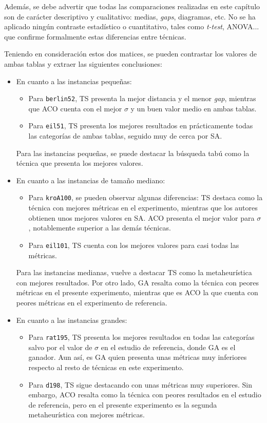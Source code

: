 Además, se debe advertir que todas las comparaciones realizadas en este capítulo son de carácter descriptivo y cualitativo:
medias, \textit{gaps}, diagramas, etc. No se ha aplicado ningún contraste estadístico o cuantitativo, tales como \textit{t-test},
ANOVA... que confirme formalmente estas diferencias entre técnicas.

Teniendo en consideración estos dos matices, se pueden contrastar los valores de ambas tablas y extraer las siguientes 
conclusiones:

\begin{itemize}
  \item En cuanto a las instancias pequeñas:
  \begin{itemize}
    \item Para \texttt{berlin52}, TS presenta la mejor distancia y el menor \textit{gap}, mientras que ACO cuenta con el mejor
    $\sigma$ y un buen valor medio en ambas tablas.
    \item Para \texttt{eil51}, TS presenta los mejores resultados en prácticamente todas las categorías de ambas tablas, 
    seguido muy de cerca por SA.
  \end{itemize}
  Para las instancias pequeñas, se puede destacar la búsqueda tabú como la técnica que presenta los mejores valores.

  \item En cuanto a las instancias de tamaño mediano:
  \begin{itemize}
    \item Para \texttt{kroA100}, se pueden observar algunas diferencias: TS destaca como la técnica con mejores métricas en el
    experimento, mientras que los autores obtienen unos mejores valores en SA. ACO presenta el mejor valor para $\sigma$, 
    notablemente superior a las demás técnicas.
    \item Para \texttt{eil101}, TS cuenta con los mejores valores para casi todas las métricas.
  \end{itemize}
  Para las instancias medianas, vuelve a destacar TS como la metaheurística con mejores resultados. Por otro lado, GA resalta
  como la técnica con peores métricas en el presente experimento, mientras que es ACO la que cuenta con peores métricas en el
  experimento de referencia.

  \item En cuanto a las instancias grandes:
  \begin{itemize}
    \item Para \texttt{rat195}, TS presenta los mejores resultados en todas las categorías salvo por el valor de $\sigma$ en el 
    estudio de referencia, donde GA es el ganador. Aun así, es GA quien presenta unas métricas muy inferiores respecto al 
    resto de técnicas en este experimento.
    \item Para \texttt{d198}, TS sigue destacando con unas métricas muy superiores. Sin embargo, ACO resalta como la técnica con
    peores resultados en el estudio de referencia, pero en el presente experimento es la segunda metaheurística con mejores 
    métricas.
  \end{itemize}


\end{itemize}
